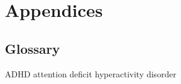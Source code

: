 \documentclass[../main.tex]{subfiles}
\begin{document}
\section*{Appendices}

\subsection*{Glossary}
ADHD attention deficit hyperactivity disorder 
\clearpage
\end{document}
